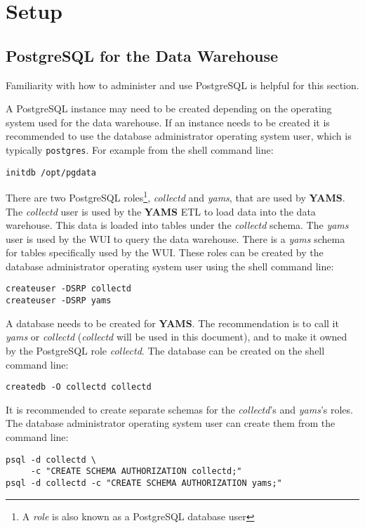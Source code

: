 \documentclass[a4paper,twoside,12pt]{article}
\begin{document}
\section{Setup}

\subsection{PostgreSQL for the Data Warehouse}

Familiarity with how to administer and use PostgreSQL is helpful for this
section.

A PostgreSQL instance may need to be created depending on the operating system
used for the data warehouse.  If an instance needs to be created it is
recommended to use the database administrator operating system user, which is
typically \texttt{postgres}.  For example from the shell command line:
\lstset{language=sh}
\begin{lstlisting}
initdb /opt/pgdata
\end{lstlisting}

There are two PostgreSQL roles\footnote{A \textit{role} is also known as a
PostgreSQL database user}, \textit{collectd} and \textit{yams}, that are used
by \textbf{YAMS}.  The \textit{collectd} user is used by the \textbf{YAMS} ETL
to load data into the data warehouse.  This data is loaded into tables under
the \textit{collectd} schema.  The \textit{yams} user is used by the WUI to
query the data warehouse.  There is a \textit{yams} schema for tables
specifically used by the WUI.  These roles can be created by the database
administrator operating system user using the shell command line:
\lstset{language=sh}
\begin{lstlisting}
createuser -DSRP collectd
createuser -DSRP yams
\end{lstlisting}

A database needs to be created for \textbf{YAMS}.  The recommendation is to
call it \textit{yams} or \textit{collectd} (\textit{collectd} will be used in
this document), and to make it owned by the PostgreSQL role \textit{collectd}.
The database can be created on the shell command line:
\lstset{language=sh}
\begin{lstlisting}
createdb -O collectd collectd
\end{lstlisting}

It is recommended to create separate schemas for the \textit{collectd}'s and
\textit{yams}'s roles.  The database administrator operating system user can
create them from the command line:
\lstset{language=sh}
\begin{lstlisting}
psql -d collectd \
     -c "CREATE SCHEMA AUTHORIZATION collectd;"
psql -d collectd -c "CREATE SCHEMA AUTHORIZATION yams;"
\end{lstlisting}
\end{document}
